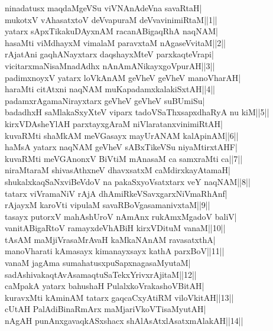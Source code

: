 \documentclass{article}
\begin{document}
ninadatusx maqdaMgeVSu viVNAnAdeVna savaRtaH|\\
mukotxV vAhasatxtoV deVvapuraM deVvavinimiRtaM||1||\\
yatarx sApxTikakuDAyxnAM racanABigaqRhA naqNAM|\\
hasaMti viMdhayxM vimalaM paravxtaM nAgaseVvitaM||2||\\
rAjatAni gaqhANayxtarx daqshayxMteV parxkaqteVrapi|\\
vicitarxmaNisaMnadAdhx nAnAmANikayxgoVpurAH||3||\\
padimxnoyxV yatarx loVkAnAM geVheV geVheV manoVharAH|\\
haraMti citAtxni naqNAM muKapadamxkalakiSxtAH||4||\\
padamxrAgamaNirayxtarx geVheV geVheV suBUmiSu|\\
badadhxH saMlakaSxyXteV viparx tadoVSaThxsapxdhaRyA nu kiM||5||\\
kirxVDAsheYlAH parxtayxgAraM niVlaratanxvinimiRtAH|\\
kuvaRMti shaMkAM meVGasayx mayUrANAM kalApinAM||6||\\
haMsA yatarx naqNAM geVheV sABxTikeVSu niyaMtirxtAHF|\\
kuvaRMti meVGAnonxV BiVtiM mAnasaM ca samxraMti ca||7||\\
niraMtaraM shivasAthxneV dhavxsatxM caMdirxkayAtamaH|\\
shukalxkaqSaNxviBeVdoV na pakaSxyoVsatxtarx veY naqNAM||8||\\
tatarx viVramaNiV rAjA dhAmiRkeVSavxgarxNiVmaRhAnf|\\
rAjayxM karoVti vipulaM savaRBoVgasamanivxtaM||9||\\
tasayx putorxV mahAshUroV nAmAnx rukAmxMgadoV baliV|\\
vanitABigaRtoV ramayxdeVhABiH kirxVDituM vanaM||10||\\
tAsAM maMjiVrasaMrAvaH kaMkaNAnAM ravasatxthA|\\
manoVharati kAmasayx kimanayxsayx kathA parxBoV||11||\\
vanaM jagAma sumahatusxpuSapxnagasaMyutaM|\\
sadAshivakaqtAvAsamaqtuSaTekxYrivxrAjitaM||12||\\
caMpakA yatarx bahushaH PulalxkoVrakashoVBitAH|\\
kuravxMti kAminAM tatarx gaqcaCxyAtiRM viloVkitAH||13||\\
cUtAH PalAdiBinaRmArx maMjariVkoVTisaMyutAH|\\
nAgAH punAnxgavaqkASxshacx shAlAsAtxlAsatxmAlakAH||14||\\
\end{document}
